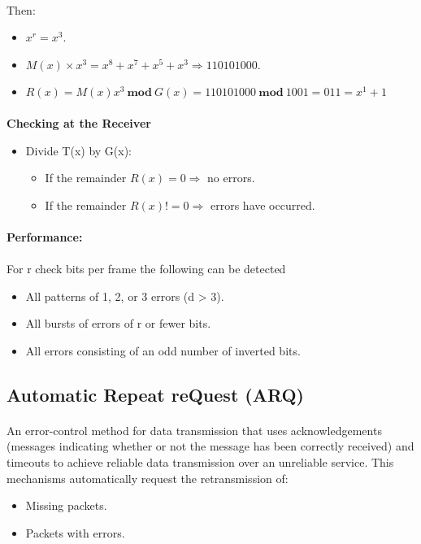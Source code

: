 \documentclass[../resumosRCOM.tex]{subfiles}
\begin{document}
\paragraph{}
Then:
\begin{itemize}
    \item $x^r = x^3$.
    \item $M(x)\times x^3 = x^8+x^7+x^5+x^3 \Rightarrow 110101000$.
    \item $R(x) = M(x)x^3\ \textbf{mod}\ G(x) = 110101000\ \textbf{mod}\ 1001
    = 011 = x^1 + 1$
\end{itemize}

\paragraph{}
\textbf{Checking at the Receiver}
\begin{itemize}
    \item Divide T(x) by G(x):
    \begin{itemize}
        \item If the remainder $R(x) = 0 \Rightarrow$ no errors.
        \item If the remainder $R(x) != 0 \Rightarrow$ errors have occurred.
    \end{itemize}
\end{itemize}

\paragraph{}
\textbf{Performance:}
\paragraph{}
For r check bits per frame the following can be detected
\begin{itemize}
    \item All patterns of 1, 2, or 3 errors (d > 3).
    \item All bursts of errors of r or fewer bits.
    \item All errors consisting of an odd number of inverted bits.
\end{itemize}


\subsection{Automatic Repeat reQuest (ARQ)}
\paragraph{}
An error-control method for data transmission that uses acknowledgements
(messages indicating whether or not the message has been correctly received)
and timeouts to achieve reliable data transmission over an unreliable service.
This mechanisms automatically request the retransmission of:
\begin{itemize}
    \item Missing packets.
    \item Packets with errors.
\end{itemize}
\end{document}
